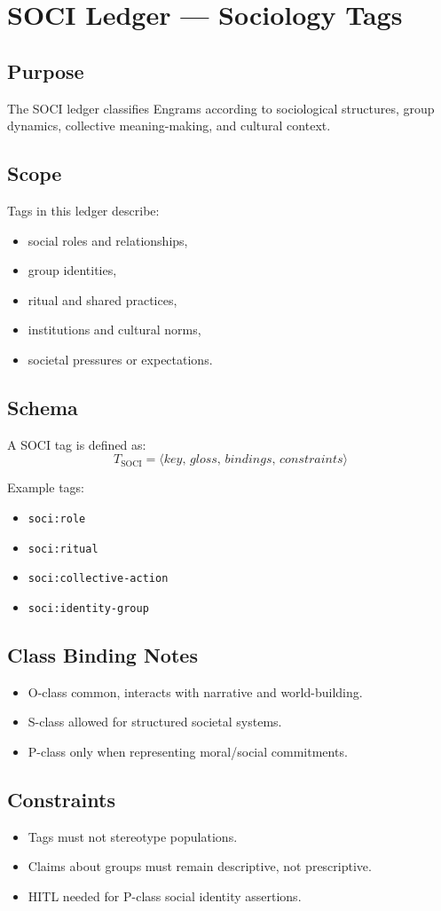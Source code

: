 \chapter{SOCI Ledger --- Sociology Tags}
\label{chap:SOCI_Ledger}

\section{Purpose}

The SOCI ledger classifies Engrams according to sociological structures,
group dynamics, collective meaning-making, and cultural context.

\section{Scope}

Tags in this ledger describe:
\begin{itemize}
    \item social roles and relationships,
    \item group identities,
    \item ritual and shared practices,
    \item institutions and cultural norms,
    \item societal pressures or expectations.
\end{itemize}

\section{Schema}

A SOCI tag is defined as:
\[
T_{\text{SOCI}} = \langle key,\, gloss,\, bindings,\, constraints \rangle
\]

Example tags:
\begin{itemize}
    \item \texttt{soci:role}
    \item \texttt{soci:ritual}
    \item \texttt{soci:collective-action}
    \item \texttt{soci:identity-group}
\end{itemize}

\section{Class Binding Notes}

\begin{itemize}
    \item O-class common, interacts with narrative and world-building.
    \item S-class allowed for structured societal systems.
    \item P-class only when representing moral/social commitments.
\end{itemize}

\section{Constraints}

\begin{itemize}
    \item Tags must not stereotype populations.
    \item Claims about groups must remain descriptive, not prescriptive.
    \item HITL needed for P-class social identity assertions.
\end{itemize}
